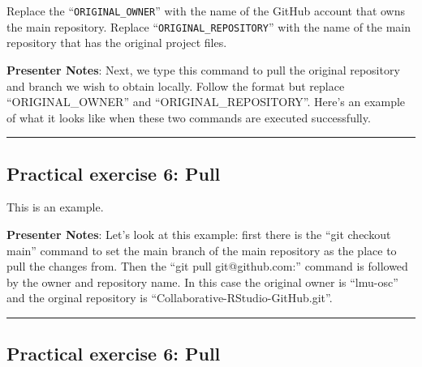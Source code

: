 \documentclass[
  letterpaper,
  DIV=11,
  numbers=noendperiod]{scrartcl}
\begin{document}
\begin{tcolorbox}[enhanced jigsaw, colbacktitle=quarto-callout-warning-color!10!white, opacityback=0, leftrule=.75mm, colback=white, opacitybacktitle=0.6, colframe=quarto-callout-warning-color-frame, title=\textcolor{quarto-callout-warning-color}{\faExclamationTriangle}\hspace{0.5em}{How to properly format this command?}, left=2mm, titlerule=0mm, toptitle=1mm, breakable, bottomtitle=1mm, arc=.35mm, rightrule=.15mm, bottomrule=.15mm, toprule=.15mm, coltitle=black]

Replace the ``\texttt{ORIGINAL\_OWNER}'' with the name of the GitHub
account that owns the main repository. Replace
``\texttt{ORIGINAL\_REPOSITORY}'' with the name of the main repository
that has the original project files.

\end{tcolorbox}

\textbf{Presenter Notes}: Next, we type this command to pull the
original repository and branch we wish to obtain locally. Follow the
format but replace ``ORIGINAL\_OWNER'' and ``ORIGINAL\_REPOSITORY''.
Here's an example of what it looks like when these two commands are
executed successfully.

\begin{center}\rule{0.5\linewidth}{0.5pt}\end{center}

\subsection{Practical exercise 6:
Pull}\label{practical-exercise-6-pull-2}

This is an example.

\textbf{Presenter Notes}: Let's look at this example: first there is the
``git checkout main'' command to set the main branch of the main
repository as the place to pull the changes from. Then the ``git pull
git@github.com:'' command is followed by the owner and repository name.
In this case the original owner is ``lmu-osc'' and the orginal
repository is ``Collaborative-RStudio-GitHub.git''.

\begin{center}\rule{0.5\linewidth}{0.5pt}\end{center}

\subsection{Practical exercise 6:
Pull}\label{practical-exercise-6-pull-3}
\end{document}

